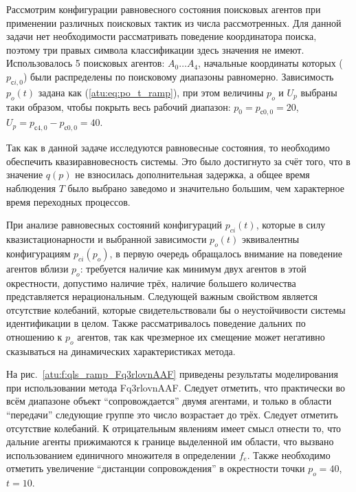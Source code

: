 Рассмотрим конфигурации равновесного состояния поисковых агентов
при применении различных поисковых тактик из числа рассмотренных.
Для данной задачи нет необходимости рассматривать поведение
координатора поиска, поэтому три правых символа классификации
здесь значения не имеют.
Использовалось 5 поисковых агентов: $A_0 \ldots A_4$,
начальные координаты которых ($p_{сi,0}$)
были распределены по поисковому диапазоны равномерно.
Зависимость $p_o(t)$
задана как (\ref{atu:eq:po_t_ramp}), при этом величины $p_o$ и $U_p$
выбраны таки образом, чтобы покрыть весь рабочий диапазон:
$p_0 = p_{с0,0} = 20$, $ U_p = p_{с4,0} - p_{с0,0} = 40$.

Так как в данной задаче исследуются равновесные состояния, то
необходимо обеспечить квазиравновесность системы.
Это было достигнуто за счёт того, что
в значение $q(p)$ не взносилась дополнительная задержка,
а общее время наблюдения $T$ было выбрано заведомо и значительно большим,
чем характерное время переходных процессов.

При анализе равновесных состояний конфигураций $p_{ci}(t)$,
которые в силу квазистационарности и выбранной зависимости $p_o(t)$
эквивалентны конфигурациям $p_{ci}(p_o)$,
в первую очередь обращалось внимание на поведение агентов
вблизи $p_o$: требуется наличие как минимум двух агентов в этой окрестности,
допустимо наличие трёх, наличие большего количества представляется нерациональным.
Следующей важным свойством является отсутствие колебаний,
которые свидетельствовали бы о неустойчивости системы идентификации в целом.
Также рассматривалось поведение дальних по отношению к $p_o$
агентов, так как чрезмерное их смещение может негативно
сказываться на динамических характеристиках метода.

На рис.~\ref{atu:f:qls_ramp_Fq3rlovnAAF} приведены результаты моделирования
при использовании метода Fq3rlovnAAF.
Следует отметить, что практически во всём диапазоне
объект ``сопровождается'' двумя агентами, и только в области
``передачи'' следующие группе это число возрастает до трёх.
Следует отметить отсутствие колебаний. К отрицательным
явлениям имеет смысл отнести то, что дальние агенты
прижимаются к границе выделенной им области, что вызвано
использованием единичного множителя в определении $f_e$. Также необходимо отметить
увеличение ``дистанции сопровождения'' в окрестности точки $p_o=40$, $t=10$.

